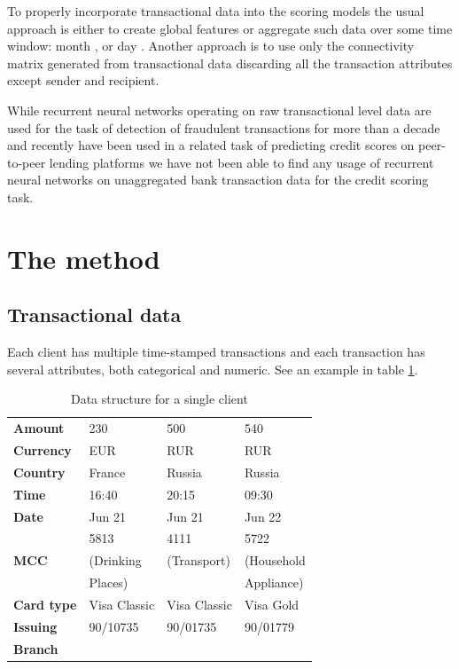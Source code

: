 \documentclass{sigkddExp}
\begin{document}
To properly incorporate transactional data into the scoring models the usual approach is either to create global features \cite{chi2012hybrid} or aggregate such data over some time window: month \cite{khandani2010consumer}, \cite{bellotti2013forecasting} or day \cite{KVAMME2018207}. Another approach is to use only the connectivity matrix generated from transactional data discarding all the transaction attributes except sender and recipient\cite{RePEc}.

While recurrent neural networks operating on raw transactional level data are used for the task of detection of fraudulent transactions for more than a decade \cite{fraud_lstm} and recently have been used in a related task of predicting credit scores on peer-to-peer lending platforms \cite{zhang2017credit} we have not been able to find any usage of recurrent neural networks on unaggregated bank transaction data for the credit scoring task.

\section{The method}

\subsection{Transactional data}

Each client has multiple time-stamped transactions and each transaction has several attributes, both categorical and numeric. See an example in table \ref{tab1}. 

\begin{table}
\caption{Data structure for a single client}
\begin{tabular}{ | l |  l l l | }
\hline
\textbf{Amount} & 230 & 500 & 540 \\
\textbf{Currency} & EUR & RUR & RUR \\
\textbf{Country} & France & Russia & Russia \\
\textbf{Time} & 16:40 & 20:15 & 09:30 \\
\textbf{Date} & Jun 21 & Jun 21 & Jun 22 \\
 & 5813 & 4111 & 5722 \\
\textbf{MCC} & (Drinking & (Transport) & (Household \\
 & Places) &  & Appliance) \\
\textbf{Card type} & Visa Classic & Visa Classic & Visa Gold \\
\textbf{Issuing} & 90/10735 & 90/01735 & 90/01779 \\
\textbf{Branch} &&& \\
\hline
\end{tabular}
\label{tab1}
\end{table}
\end{document}
